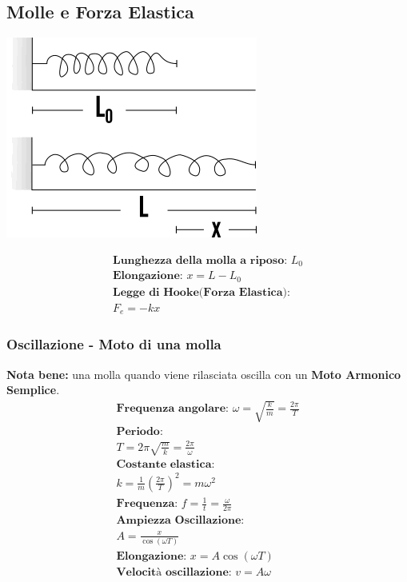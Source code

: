 \subsection{Molle e Forza Elastica}
\begin{center}
\includegraphics[width=0.4 \linewidth]{Dinamica/forza-elastica.png} 
\end{center}
\begin{gather*}
    \textbf{Lunghezza della molla a riposo: } L_0 \\
    \textbf{Elongazione: } x = L - L_0 \\
    \textbf{Legge di Hooke(Forza Elastica): } \\ F_e = -k x 
\end{gather*}
\subsubsection{Oscillazione - Moto di una molla}
\textbf{Nota bene: } una molla quando viene rilasciata oscilla con un \textbf{Moto Armonico Semplice}.
\begin{gather*}
    \textbf{Frequenza angolare: } \omega = \sqrt{\frac{k}{m}} = \frac{2 \pi}{T} \\
    \textbf{Periodo: } \\ T = 2 \pi \sqrt{\frac{m}{k}} = \frac{2 \pi}{\omega} \\
    \textbf{Costante elastica: } \\ k = \frac{1}{m} (\frac{2 \pi}{T})^2 = m \omega^2 \\
    \textbf{Frequenza: } f = \frac{1}{t} = \frac{\omega}{2 \pi} \\
    \textbf{Ampiezza Oscillazione: } \\ A = \frac{x}{\cos (\omega T)} \\
    \textbf{Elongazione: } x = A \cos (\omega T) \\
    \textbf{Velocità oscillazione: } v = A \omega
\end{gather*}